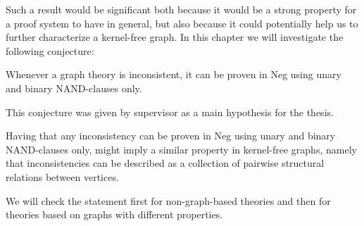 Such a result would be significant both because it would be a strong property for a proof system to have in general, but also because it could potentially help us to further characterize a kernel-free graph.
In this chapter we will investigate the following conjecture:
\begin{conjecture}
  Whenever a graph theory is inconsistent, it can be proven in Neg using unary and binary NAND-clauses only.
\end{conjecture}
This conjecture was given by supervisor as a main hypothesis for the thesis.

Having that any inconsistency can be proven in Neg using unary and binary NAND-clauses only, might imply a similar property in kernel-free graphs, namely that inconsistencies can be described as a collection of pairwise structural relations between vertices.

We will check the statement first for non-graph-based theories and then for theories based on graphs with different properties.
